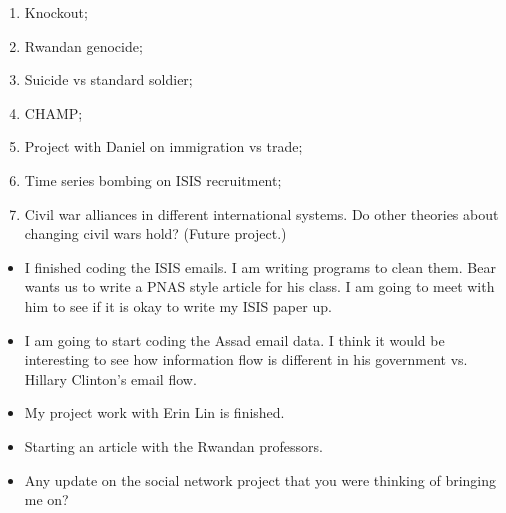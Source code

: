 \documentclass[letterpaper,11pt]{article}
\begin{document}
\begin{enumerate}
\item Knockout; 
\item Rwandan genocide; 
\item Suicide vs standard soldier; 
\item CHAMP;
\item Project with Daniel on immigration vs trade;
\item Time series bombing on ISIS recruitment; 
\item Civil war alliances in different international systems. Do other theories about changing civil wars hold? (Future project.)
\end{enumerate}

\begin{itemize}
\item I finished coding the ISIS emails. I am writing programs to clean them. Bear wants us to write a PNAS style article for his class. I am going to meet with him to see if it is okay to write my ISIS paper up. 
\item I am going to start coding the Assad email data. I think it would be interesting to see how information flow is different in his government vs. Hillary Clinton's email flow. 
\item My project work with Erin Lin is finished. 
\item Starting an article with the Rwandan professors. 
\item Any update on the social network project that you were thinking of bringing me on? 
\end{itemize}
\end{document}
